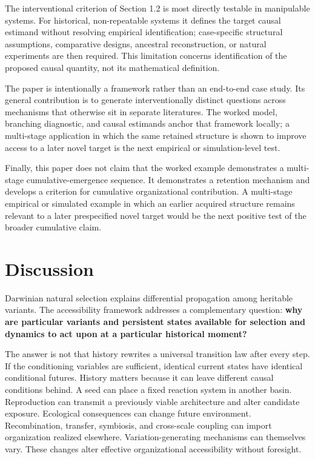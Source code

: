 \documentclass[11pt,a4paper]{article}
\begin{document}
The interventional criterion of Section 1.2 is most directly testable in manipulable systems. For historical, non-repeatable systems it defines the target causal estimand without resolving empirical identification; case-specific structural assumptions, comparative designs, ancestral reconstruction, or natural experiments are then required. This limitation concerns identification of the proposed causal quantity, not its mathematical definition.

The paper is intentionally a framework rather than an end-to-end case study. Its general contribution is to generate interventionally distinct questions across mechanisms that otherwise sit in separate literatures. The worked model, branching diagnostic, and causal estimands anchor that framework locally; a multi-stage application in which the same retained structure is shown to improve access to a later novel target is the next empirical or simulation-level test.

Finally, this paper does not claim that the worked example demonstrates a multi-stage cumulative-emergence sequence. It demonstrates a retention mechanism and develops a criterion for cumulative organizational contribution. A multi-stage empirical or simulated example in which an earlier acquired structure remains relevant to a later prespecified novel target would be the next positive test of the broader cumulative claim.

\section{Discussion}

Darwinian natural selection explains differential propagation among heritable variants. The accessibility framework addresses a complementary question: \textbf{why are particular variants and persistent states available for selection and dynamics to act upon at a particular historical moment?}

The answer is not that history rewrites a universal transition law after every step. If the conditioning variables are sufficient, identical current states have identical conditional futures. History matters because it can leave different causal conditions behind. A seed can place a fixed reaction system in another basin. Reproduction can transmit a previously viable architecture and alter candidate exposure. Ecological consequences can change future environment. Recombination, transfer, symbiosis, and cross-scale coupling can import organization realized elsewhere. Variation-generating mechanisms can themselves vary. These changes alter effective organizational accessibility without foresight.
\end{document}
